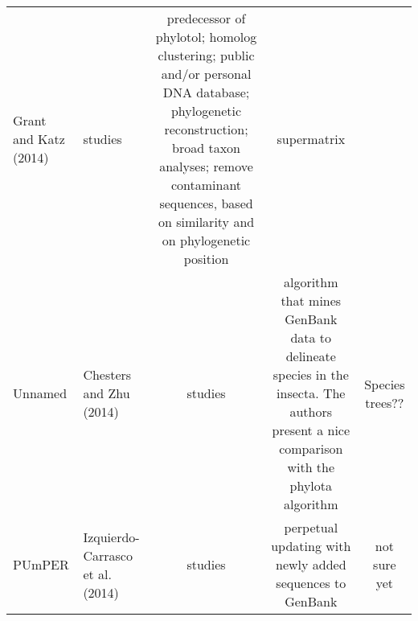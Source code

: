 \documentclass[draft]{ametsoc}
\begin{document}
\begin{longtable}[]{@{}llccc@{}}
\begin{minipage}[t]{0.15\columnwidth}
Grant and Katz (2014)\strut
\end{minipage} & \begin{minipage}[t]{0.20\columnwidth}\centering
38 studies\strut
\end{minipage} & \begin{minipage}[t]{0.20\columnwidth}\centering
predecessor of phylotol; homolog clustering; public and/or personal DNA
database; phylogenetic reconstruction; broad taxon analyses; remove
contaminant sequences, based on similarity and on phylogenetic
position\strut
\end{minipage} & \begin{minipage}[t]{0.20\columnwidth}\centering
supermatrix\strut
\end{minipage}\tabularnewline
\begin{minipage}[t]{0.12\columnwidth}\raggedright
Unnamed\strut
\end{minipage} & \begin{minipage}[t]{0.15\columnwidth}\raggedright
Chesters and Zhu (2014)\strut
\end{minipage} & \begin{minipage}[t]{0.20\columnwidth}\centering
10 studies\strut
\end{minipage} & \begin{minipage}[t]{0.20\columnwidth}\centering
algorithm that mines GenBank data to delineate species in the insecta.
The authors present a nice comparison with the phylota algorithm\strut
\end{minipage} & \begin{minipage}[t]{0.20\columnwidth}\centering
Species trees??\strut
\end{minipage}\tabularnewline
\begin{minipage}[t]{0.12\columnwidth}\raggedright
PUmPER\strut
\end{minipage} & \begin{minipage}[t]{0.15\columnwidth}\raggedright
Izquierdo-Carrasco et al. (2014)\strut
\end{minipage} & \begin{minipage}[t]{0.20\columnwidth}\centering
14 studies\strut
\end{minipage} & \begin{minipage}[t]{0.20\columnwidth}\centering
perpetual updating with newly added sequences to GenBank\strut
\end{minipage} & \begin{minipage}[t]{0.20\columnwidth}\centering
not sure yet\strut
\end{minipage}\tabularnewline

\end{longtable}
\end{document}
